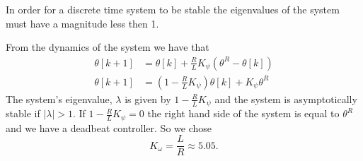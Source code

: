 In order for a discrete time system to be stable the eigenvalues of the system must have a magnitude less then 1. 

From the dynamics of the system we have that
\begin{align*}
    \theta[k+1]&=\theta[k]+ \frac{R}{L} K_\psi(\theta^R-\theta[k])\\
    \theta[k+1]&=(1- \frac{R}{L} K_\psi)\theta[k]+K_\psi\theta^R
\end{align*} The system's eigenvalue, $\lambda$ is given by $1 - \frac{R}{L} K_\psi$ and the system is asymptotically stable if $|\lambda| > 1.$ 
If $1 - \frac{R}{L} K_\psi = 0$ the right hand side of the system is equal to $\theta^R$ and we have a deadbeat controller. So we chose
\[
K_\omega = \frac{L}{R} \approx 5.05.
\]
